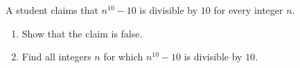 A student claims that $n^{10}-10$ is divisible by $10$ for every integer $n$.
\begin{enumerate}
\item[(a)] Show that the claim is false.
\item[(b)] Find all integers $n$ for which $n^{10}-10$ is divisible by $10$.
\end{enumerate}
